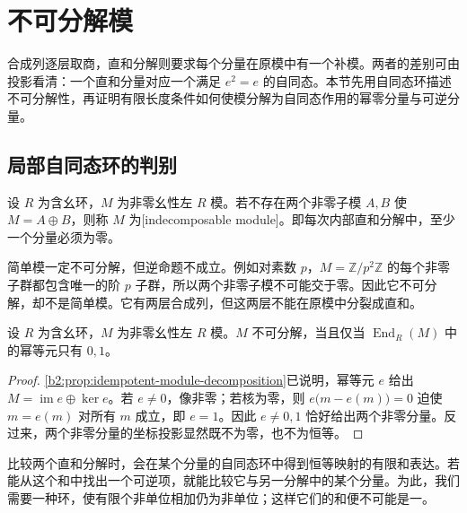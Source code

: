 
\section{不可分解模}
\label{b2:sec:1203}

合成列逐层取商，直和分解则要求每个分量在原模中有一个补模。两者的差别可由投影看清：一个直和分量对应一个满足 \(e^2=e\) 的自同态。本节先用自同态环描述不可分解性，再证明有限长度条件如何使模分解为自同态作用的幂零分量与可逆分量。

%
%

\subsection{局部自同态环的判别}
\label{b2:subsec:1203:01}

\begin{definition}\label{b2:def:indecomposable-module}
	设 \(R\) 为含幺环，\(M\) 为非零幺性左 \(R\) 模。若不存在两个非零子模 \(A,B\) 使 \(M=A\oplus B\)，则称 \(M\) 为[indecomposable module]。即每次内部直和分解中，至少一个分量必须为零。
\end{definition}

简单模一定不可分解，但逆命题不成立。例如对素数 \(p\)，\(M=\mathbb Z/p^2\mathbb Z\) 的每个非零子群都包含唯一的阶 \(p\) 子群，所以两个非零子模不可能交于零。因此它不可分解，却不是简单模。它有两层合成列，但这两层不能在原模中分裂成直和。

\begin{corollary}\label{b2:prop:idempotent-direct-sum}
	设 \(R\) 为含幺环，\(M\) 为非零幺性左 \(R\) 模。\(M\) 不可分解，当且仅当 \(\operatorname{End}_R(M)\) 中的幂等元只有 \(0,1\)。
\end{corollary}
\begin{proof}
	\cref{b2:prop:idempotent-module-decomposition}已说明，幂等元 \(e\) 给出 \(M=\operatorname{im}e\oplus\ker e\)。若 \(e\ne0\)，像非零；若核为零，则 \(e\bigl(m-e(m)\bigr)=0\) 迫使 \(m=e(m)\) 对所有 \(m\) 成立，即 \(e=1\)。因此 \(e\ne0,1\) 恰好给出两个非零分量。反过来，两个非零分量的坐标投影显然既不为零，也不为恒等。
\end{proof}

比较两个直和分解时，会在某个分量的自同态环中得到恒等映射的有限和表达。若能从这个和中找出一个可逆项，就能比较它与另一分解中的某个分量。为此，我们需要一种环，使有限个非单位相加仍为非单位；这样它们的和便不可能是一。

